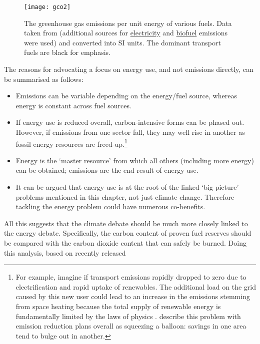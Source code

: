 \begin{figure}[htbp]
  \centerline{
    \texttt{[image: gco2]}}
  \caption[The greenhouse gas emissions per unit energy of various fuels]
{The greenhouse gas emissions per unit energy of various fuels. Data
taken from \citet{Defra2011} (additional sources for
\href{http://www.ipcc.ch/pdf/special-reports/sroc/Tables/t0305.pdf}{\color{blue}electricity}
and
\href{http://www.biomassenergycentre.org.uk/portal/page?_pageid=75,163182&_dad=portal&_schema=PORTAL}{\color{blue}biofuel}
emissions were used)
and converted into SI units. The dominant
transport fuels are black for emphasis.  }
  \label{fgco2}
\end{figure}

The reasons for advocating a focus on energy use,
and not emissions directly, can be summarised as follows:
\begin{itemize}
 \item Emissions can be variable depending on the energy/fuel source, whereas
 energy is constant across fuel sources.
 \item If energy use is reduced overall, carbon-intensive forms can be phased out.
However, if emissions from one sector fall, they may well rise in another as
fossil energy resources are freed-up.\footnote{For
example, imagine if transport emissions rapidly dropped to zero
due to electrification and rapid uptake of renewables. The additional
load on the grid caused by this new user \citep{dyke2010impact} could
lead to an increase in the emissions stemming from space heating because
the total supply of renewable energy is fundamentally
limited by the laws of physics \citep{MacKay2009}. \citet{Berners-Lee2013}
describe this problem with emission reduction plans overall as squeezing
a balloon: savings in one area tend to bulge out in another.}
 \item Energy is the `master resource' from which all others (including more
energy) can be obtained; emissions are the end result of energy use.
 \item It can be argued that energy use is at the root of the linked `big picture'
problems mentioned in this chapter, not just climate change. Therefore
tackling the energy problem could have numerous co-benefits.
\end{itemize}
All this suggests that the climate debate should be much more closely
linked to the energy debate. Specifically, the carbon content of proven
fuel reserves should be compared with the carbon dioxide content that
can safely be burned. Doing this analysis, based on recently released
